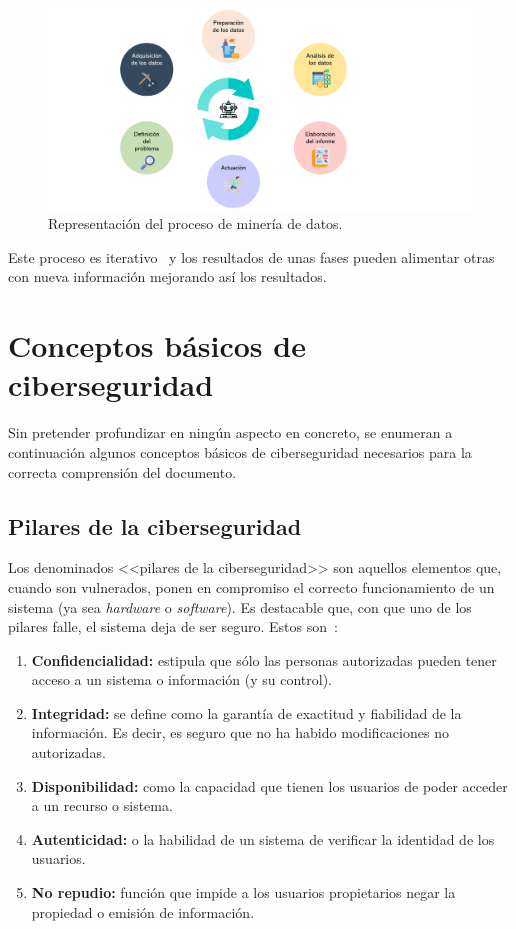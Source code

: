 \begin{figure}[h]
	\caption[Proceso de minería de datos: metodología]{Representación del proceso de minería de datos.}
	\label{img:proceso_mineria}
	\centering
	\includegraphics[scale=0.5]{../img/memoria/3_ML_phases.pdf}
\end{figure}


Este proceso es iterativo~\cite{apuntesMineria} y los resultados de unas fases pueden alimentar otras con nueva información mejorando así los resultados.


\section{Conceptos básicos de ciberseguridad}

Sin pretender profundizar en ningún aspecto en concreto, se enumeran a continuación algunos conceptos básicos de ciberseguridad necesarios para la correcta comprensión del documento.

\subsection{Pilares de la ciberseguridad}

Los denominados <<pilares de la ciberseguridad>> son aquellos elementos que, cuando son vulnerados, ponen en compromiso el correcto funcionamiento de un sistema (ya sea \textit{hardware} o \textit{software}). Es destacable que, con que uno de los pilares falle, el sistema deja de ser seguro. Estos son~\cite{pilaresciber}:

\begin{enumerate}
	\item \textbf{Confidencialidad:} estipula que sólo las personas autorizadas pueden tener acceso a un sistema o información (y su control).
	\item \textbf{Integridad:} se define como la garantía de exactitud y fiabilidad de la información. Es decir, es seguro que no ha habido modificaciones no autorizadas.
	\item \textbf{Disponibilidad:} como la capacidad que tienen los usuarios de poder acceder a un recurso o sistema.
	\item \textbf{Autenticidad:} o la habilidad de un sistema de verificar la identidad de los usuarios.
	\item \textbf{No repudio:} función que impide a los usuarios propietarios negar la propiedad o emisión de información.
\end{enumerate}


